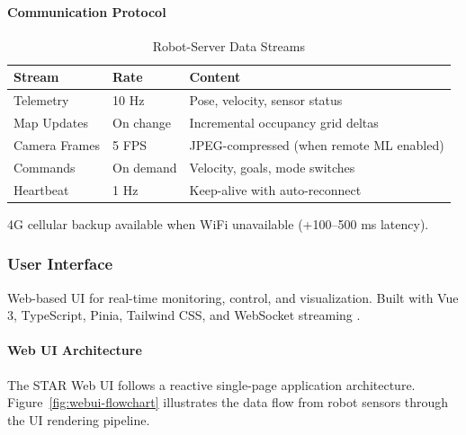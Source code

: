 \paragraph{Communication Protocol}

\begin{table}[H]
\centering
\caption{Robot-Server Data Streams}
\begin{tabular}{@{}lll@{}}
\toprule
\textbf{Stream} & \textbf{Rate} & \textbf{Content} \\
\midrule
Telemetry & 10 Hz & Pose, velocity, sensor status \\
Map Updates & On change & Incremental occupancy grid deltas \\
Camera Frames & 5 FPS & JPEG-compressed (when remote ML enabled) \\
Commands & On demand & Velocity, goals, mode switches \\
Heartbeat & 1 Hz & Keep-alive with auto-reconnect \\
\bottomrule
\end{tabular}
\end{table}

4G cellular backup available when WiFi unavailable (+100--500 ms latency).

\subsubsection{User Interface}

Web-based UI for real-time monitoring, control, and visualization. Built with Vue 3, TypeScript, Pinia, Tailwind CSS, and WebSocket streaming \parencite{vue3_documentation, typescript_documentation}.

\paragraph{Web UI Architecture}

The STAR Web UI follows a reactive single-page application architecture. Figure~\ref{fig:webui-flowchart} illustrates the data flow from robot sensors through the UI rendering pipeline.

